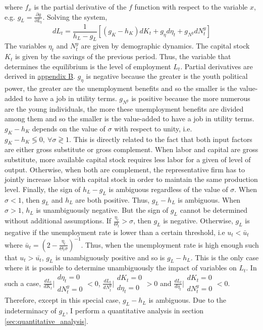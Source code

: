where $f_x$ is the partial derivative of the $f$ function with respect to the variable $x$, e.g. $g_L = \frac{\partial g}{\partial L_t}$. Solving the system,
	\begin{equation*}
		dL_t = \frac{1}{h_L-g_L}\left[(g_K-h_K) dK_t + g_\eta d\eta_t + g_{N^y} dN_t^y \right]
	\end{equation*}
The variables $\eta_t$ and $N_t^y$ are given by demographic dynamics. The capital stock $K_t$ is given by the savings of the previous period. Thus, the variable that determines the equilibrium is the level of employment $L_t$. Partial derivatives are derived in \hyperref[appendix:derivatives]{appendix B}. $g_\eta$ is negative because the greater is the youth political power, the greater are the unemployment benefits and so the smaller is the value-added to have a job in utility terms. $g_{N^y}$ is positive because the more numerous are the young individuals, the more these unemployment benefits are divided among them and so the smaller is the value-added to have a job in utility terms. $g_K-h_K$ depends on the value of $\sigma$ with respect to unity, i.e. $g_K-h_K \lessgtr 0, ~ \forall \sigma \gtrless 1$. This is directly related to the fact that both input factors are either gross substitute or gross complement. When labor and capital are gross substitute, more available capital stock requires less labor for a given of level of output. Otherwise, when both are complement, the representative firm has to jointly increase labor with capital stock in order to maintain the same production level. Finally, the sign of $h_L-g_L$ is ambiguous regardless of the value of $\sigma$. When $\sigma < 1$, then $g_L$ and $h_L$ are both positive. Thus, $g_L-h_L$ is ambiguous. When $\sigma > 1$, $h_L$ is unambiguously negative. But the sign of $g_L$ cannot be determined without additional assumptions. If $\frac{\eta_t}{\Theta_t} > \sigma$, then $g_L$ is negative. Otherwise, $g_L$ is negative if the unemployment rate is lower than a certain threshold, i.e $u_t < \bar{u}_t$ where $\bar{u}_t = \left(2 - \frac{\eta_t}{\Theta_t\sigma}\right)^{-1}$. Thus, when the unemployment rate is high enough such that $u_t > \bar{u_t}$, $g_L$ is unambiguously positive and so is $g_L-h_L$. This is the only case where it is possible to determine unambiguously the impact of variables on $L_t$. In such a case, $\frac{dL_t}{dK_t}\Bigr|{\substack{d\eta_t = 0\\dN_t^y = 0}} < 0$, $\frac{dL_t}{dN^y_t}\Bigr|{\substack{dK_t = 0\\d\eta_t = 0}} > 0$ and $\frac{dL_t}{d\eta_t}\Bigr|{\substack{dK_t = 0\\dN_t^y = 0}} < 0$. Therefore, except in this special case, $g_L-h_L$ is ambiguous. Due to the indeterminacy of $g_L$, I perform a quantitative analysis in section \ref{sec:quantitative_analysis}.